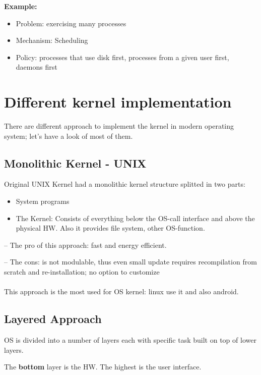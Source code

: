 \textbf{Example: }
\begin{itemize}
    \item[] Problem: exercising many processes
    \item[] Mechanism: Scheduling
    \item[] Policy: processes that use disk first, processes from a given user first, daemons first
\end{itemize}

\newpage
\section{Different kernel implementation}
There are different approach to implement the kernel in modern operating system; let's have a look of most of them.

\subsection{Monolithic Kernel - UNIX}
Original UNIX Kernel had a monolithic kernel structure splitted in two parts:

\begin{itemize}
    \item System programs
    \item The Kernel: Consists of everything below the OS-call interface and above the physical HW. Also it provides file system, other OS-function.
\end{itemize}

-- The pro of this approach: fast and energy efficient.

-- The cons: is not modulable, thus even small update requires recompilation from scratch and re-installation; no option to customize
\paragraph{}
This approach is the most used for OS kernel: linux use it and also android.




\subsection{Layered Approach}
OS is divided into a number of layers each with specific task built on top of lower layers. 

The \textbf{bottom} layer is the HW. The highest is the user interface.



